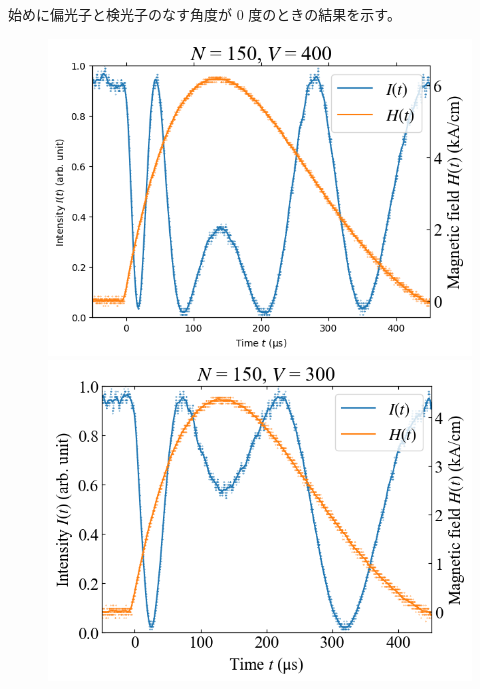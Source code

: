 \documentclass[9pt,dvipdfmx,a4paper]{jsarticle}
\begin{document}
始めに偏光子と検光子のなす角度が 0 度のときの結果を示す。
\begin{figure}[H]
    \centering
    \begin{minipage}[t]{0.24\columnwidth}
        \centering
        \includegraphics[width = \columnwidth]{xt/01.png}
    \end{minipage}
    \hfill
    \begin{minipage}[t]{0.24\columnwidth}
        \centering
        \includegraphics[width = \columnwidth]{xt/02.png}
    \end{minipage}
    \hfill
    \begin{minipage}[t]{0.24\columnwidth}
        \centering

\end{minipage}
\end{figure}
\end{document}
